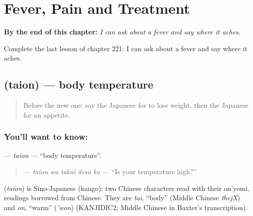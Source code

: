 
\chapter{Fever, Pain and Treatment}
\label{ch:ja-fever-pain-and-treatment}

\begin{chapteropening}
\textbf{By the end of this chapter:} \emph{I can ask about a fever and say where it aches.}

Complete the last lesson of chapter 221: I can ask about a fever and say where it aches.
\end{chapteropening}

\section[\texorpdfstring{\ja{たいおん} (taion)}{たいおん (taion)}]{ (taion) — body temperature}

\label{lesson:JA-C221-taion}



\begin{quote}
Before the new one: say the Japanese for to lose weight, then the Japanese for an appetite.
\end{quote}

\subsection*{You'll want to know: }
\textbf{} — \emph{taion} — \textquotedblleft{}body temperature\textquotedblright{}.

\begin{quote}
\textbf{ } — \emph{taion wa takai desu ka} — \textquotedblleft{}Is your temperature high?\textquotedblright{}
\end{quote}

\begin{cousinweb}
\textbf{} (\emph{taion}) is Sino-Japanese (kango): two Chinese characters read with their on'yomi, readings borrowed from Chinese. They are \emph{tai}, \textquotedblleft{}body\textquotedblright{} (Middle Chinese \emph{thejX}) and \emph{on}, \textquotedblleft{}warm\textquotedblright{} (\emph{'won}) (KANJIDIC2; Middle Chinese in Baxter's transcription).
\end{cousinweb}

